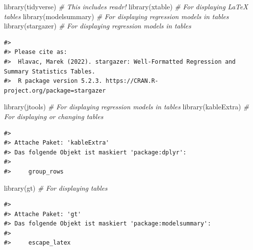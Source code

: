 \documentclass[
  11pt,
  a4paper,
  twoside]{scrbook}
\newenvironment{Shaded}{\begin{snugshade}}{\end{snugshade}}
\newcommand{\CommentTok}[1]{\textcolor[rgb]{0.56,0.35,0.01}{\textit{#1}}}
\newcommand{\FunctionTok}[1]{\textcolor[rgb]{0.00,0.00,0.00}{#1}}
\newcommand{\NormalTok}[1]{#1}
\begin{document}
\linespread{1}

\begin{Shaded}
\begin{Highlighting}[]
\FunctionTok{library}\NormalTok{(tidyverse) }\CommentTok{\# This includes readr!}
\FunctionTok{library}\NormalTok{(xtable) }\CommentTok{\# For displaying LaTeX tables}
\FunctionTok{library}\NormalTok{(modelsummary) }\CommentTok{\# For displaying regression models in tables}
\FunctionTok{library}\NormalTok{(stargazer) }\CommentTok{\# For displaying regression models in tables}
\end{Highlighting}
\end{Shaded}

\linespread{1}

\begin{verbatim}
#> 
#> Please cite as:
#>  Hlavac, Marek (2022). stargazer: Well-Formatted Regression and Summary Statistics Tables.
#>  R package version 5.2.3. https://CRAN.R-project.org/package=stargazer
\end{verbatim}

\linespread{1}

\begin{Shaded}
\begin{Highlighting}[]
\FunctionTok{library}\NormalTok{(jtools) }\CommentTok{\# For displaying regression models in tables}
\FunctionTok{library}\NormalTok{(kableExtra) }\CommentTok{\# For displaying or changing tables}
\end{Highlighting}
\end{Shaded}

\linespread{1}

\begin{verbatim}
#> 
#> Attache Paket: 'kableExtra'
#> Das folgende Objekt ist maskiert 'package:dplyr':
#> 
#>     group_rows
\end{verbatim}

\linespread{1}

\begin{Shaded}
\begin{Highlighting}[]
\FunctionTok{library}\NormalTok{(gt) }\CommentTok{\# For displaying tables}
\end{Highlighting}
\end{Shaded}

\linespread{1}

\begin{verbatim}
#> 
#> Attache Paket: 'gt'
#> Das folgende Objekt ist maskiert 'package:modelsummary':
#> 
#>     escape_latex
\end{verbatim}
\end{document}

